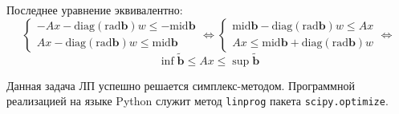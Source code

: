 \begin{remark}
	Последнее уравнение эквивалентно:
	\begin{equation*}
	\begin{cases}
		-Ax - \textrm{diag}(\textrm{rad} \mathbf{b}) w \leq -\textrm{mid} \mathbf{b} \\
		Ax - \textrm{diag}(\textrm{rad} \mathbf{b}) w \leq \textrm{mid} \mathbf{b}
	\end{cases}
	\Longleftrightarrow 
	\begin{cases}
	\textrm{mid} \mathbf{b} - \textrm{diag}(\textrm{rad} \mathbf{b}) w \leq Ax\\
	Ax \leq \textrm{mid} \mathbf{b} + \textrm{diag}(\textrm{rad} \mathbf{b}) w
	\end{cases}
		\Longleftrightarrow 
	\end{equation*}
	\begin{equation}
	\inf \tilde{\mathbf{b}} \leq Ax \leq \sup \tilde{\mathbf{b}}
	\end{equation}
\end{remark}

Данная задача ЛП успешно решается симплекс-методом. Программной реализацией на языке Python служит метод \texttt{linprog} пакета \texttt{scipy.optimize}.